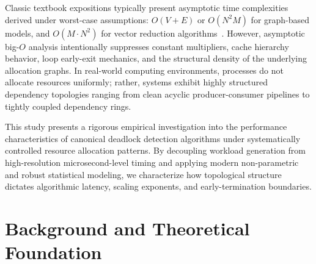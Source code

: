 \documentclass[11pt,a4paper]{article}
\begin{document}
Classic textbook expositions typically present asymptotic time complexities derived under worst-case assumptions: $O(V + E)$ or $O(N^2 M)$ for graph-based models, and $O(M \cdot N^2)$ for vector reduction algorithms~\cite{silberschatz2018operating, cormen2022introduction}. However, asymptotic big-$O$ analysis intentionally suppresses constant multipliers, cache hierarchy behavior, loop early-exit mechanics, and the structural density of the underlying allocation graphs. In real-world computing environments, processes do not allocate resources uniformly; rather, systems exhibit highly structured dependency topologies ranging from clean acyclic producer-consumer pipelines to tightly coupled dependency rings.

This study presents a rigorous empirical investigation into the performance characteristics of canonical deadlock detection algorithms under systematically controlled resource allocation patterns. By decoupling workload generation from high-resolution microsecond-level timing and applying modern non-parametric and robust statistical modeling, we characterize how topological structure dictates algorithmic latency, scaling exponents, and early-termination boundaries.

\section{Background and Theoretical Foundation}
\end{document}
